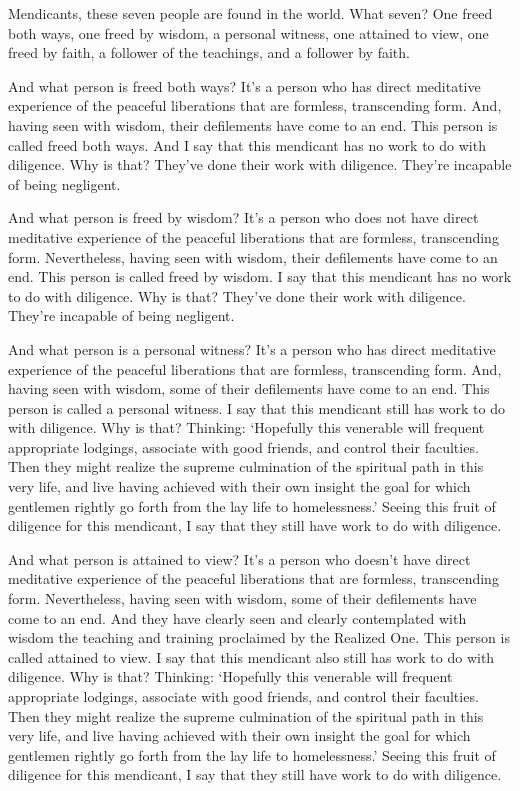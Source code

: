 \documentclass[12pt,openany]{book}%
\begin{document}
Mendicants, these seven people are found in the world. What seven? One freed both ways, one freed by wisdom, a personal witness, one attained to view, one freed by faith, a follower of the teachings, and a follower by faith. 

And what person is freed both ways? It’s a person who has direct meditative experience of the peaceful liberations that are formless, transcending form. And, having seen with wisdom, their defilements have come to an end. This person is called freed both ways. And I say that this mendicant has no work to do with diligence. Why is that? They’ve done their work with diligence. They’re incapable of being negligent. 

And what person is freed by wisdom? It’s a person who does not have direct meditative experience of the peaceful liberations that are formless, transcending form. Nevertheless, having seen with wisdom, their defilements have come to an end. This person is called freed by wisdom. I say that this mendicant has no work to do with diligence. Why is that? They’ve done their work with diligence. They’re incapable of being negligent. 

And what person is a personal witness? It’s a person who has direct meditative experience of the peaceful liberations that are formless, transcending form. And, having seen with wisdom, some of their defilements have come to an end. This person is called a personal witness. I say that this mendicant still has work to do with diligence. Why is that? Thinking: ‘Hopefully this venerable will frequent appropriate lodgings, associate with good friends, and control their faculties. Then they might realize the supreme culmination of the spiritual path in this very life, and live having achieved with their own insight the goal for which gentlemen rightly go forth from the lay life to homelessness.’ Seeing this fruit of diligence for this mendicant, I say that they still have work to do with diligence. 

And what person is attained to view? It’s a person who doesn’t have direct meditative experience of the peaceful liberations that are formless, transcending form. Nevertheless, having seen with wisdom, some of their defilements have come to an end. And they have clearly seen and clearly contemplated with wisdom the teaching and training proclaimed by the Realized One. This person is called attained to view. I say that this mendicant also still has work to do with diligence. Why is that? Thinking: ‘Hopefully this venerable will frequent appropriate lodgings, associate with good friends, and control their faculties. Then they might realize the supreme culmination of the spiritual path in this very life, and live having achieved with their own insight the goal for which gentlemen rightly go forth from the lay life to homelessness.’ Seeing this fruit of diligence for this mendicant, I say that they still have work to do with diligence. 
\end{document}
